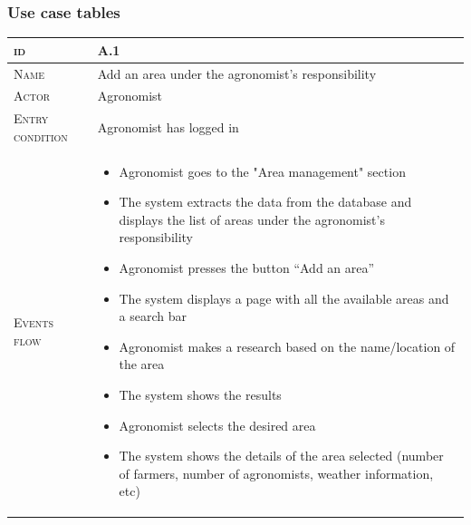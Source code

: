 \subsubsection*{Use case tables}

\begin{table}[H]
    \centering
    \begin{tabular}[c]{|l|p{}|}
        \hline %
    	\textsc{id}                 &   A.1\\
    	\hline %

    	\textsc{Name}               &   Add an area under the agronomist's responsibility\\
    	\hline %
    	\textsc{Actor}             &   Agronomist\\
    	\hline %
    	\textsc{Entry condition}   &   Agronomist has logged in\\
    	\hline %
    	\textsc{Events flow}         &   %
            	                        \begin{itemize}
                                    	    \item Agronomist goes to the "Area management" section
                                    	    \item The system extracts the data from the database and displays the list of areas under the agronomist's responsibility
                                    	    \item Agronomist presses the button “Add an area”
                                    		\item The system displays a page with all the available areas and a search bar
                                    		\item Agronomist makes a research based on the name/location of the area
                                    		\item The system shows the results
                                    		\item Agronomist selects the desired area
                                    		\item The system shows the details of the area selected (number of farmers, number of agronomists, weather information, etc)

\end{itemize}
\end{tabular}
\end{table}
